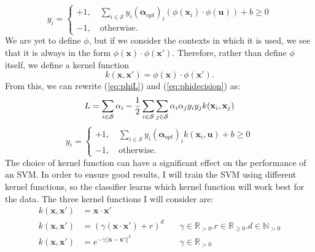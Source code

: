 \documentclass[12pt,a4paper,twoside,openright]{report}
\begin{document}
\begin{equation} \label{eq:phidecision}
	y_i =
	\begin{cases}
		+1, \quad \displaystyle \sum_{i \in \mathcal{S}} y_i(\boldsymbol{\alpha}_{opt})_i (\phi (\mathbf{x}_i) \cdot \phi (\mathbf{u})) + b \ge 0 \\
		-1, \quad \text{otherwise}.
	\end{cases}
\end{equation}
We are yet to define $\phi$, but if we consider the contexts in which it is used, we see that it is always in the form $\phi (\mathbf{x}) \cdot \phi (\mathbf{x}')$. Therefore, rather than define $\phi$ itself, we define a kernel function
\begin{equation}
	k(\mathbf{x}, \mathbf{x}') = \phi (\mathbf{x}) \cdot \phi (\mathbf{x}').
\end{equation}
From this, we can rewrite (\ref{eq:phiL}) and (\ref{eq:phidecision}) as:
\begin{equation}
	L = \sum_{i \in \mathcal{S}} \alpha_i - \frac{1}{2}\sum_{i \in \mathcal{S}} \sum_{j \in \mathcal{S}} \alpha_i \alpha_j y_i y_j k(\mathbf{x}_i, \mathbf{x}_j) \\
\end{equation}
\begin{equation}
	y_i =
	\begin{cases}
		+1, \quad \displaystyle \sum_{i \in \mathcal{S}} y_i(\boldsymbol{\alpha}_{opt})_i k(\mathbf{x}_i, \mathbf{u}) + b \ge 0 \\
		-1, \quad \text{otherwise}.
	\end{cases}
\end{equation}
The choice of kernel function can have a significant effect on the performance of an SVM. In order to ensure good results, I will train the SVM using different kernel functions, so the classifier learns which kernel function will work best for the data. The three kernel functions I will consider are:
\begin{align}
	k(\mathbf{x}, \mathbf{x}') & = \mathbf{x} \cdot \mathbf{x}'& \label{eq:linearkernel} \\
	k(\mathbf{x}, \mathbf{x}') & = (\gamma (\mathbf{x} \cdot \mathbf{x}') + r)^d \quad & \gamma \in \mathbb{R}_{> 0} . r \in \mathbb{R}_{\ge 0} . d \in \mathbb{N}_{> 0} \label{eq:polykernel} \\
	k(\mathbf{x}, \mathbf{x}') & = e^{-\gamma ||\mathbf{x} - \mathbf{x}'||^2} \quad & \gamma \in \mathbb{R}_{> 0} \label{eq:rbfkernel}
\end{align}
\end{document}
